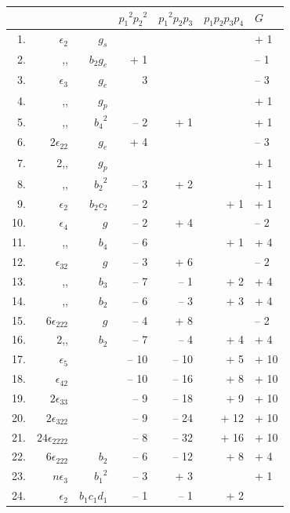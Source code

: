 \documentclass[11pt,a4paper,english]{article}
\theoremstyle{plain}
\begin{document}
\begin{center}
\begin{tabular}{r @{\quad} r @{\quad} r | r | r | r}
& & & ${p_1}^2{p_2}^2$ & ${p_1}^2p_2p_3$ & $p_1p_2p_3p_4$ & $G$ \\ .& $\epsilon_2$ & $g_s$ & & & & + 1 \\
2.& ,, & $b_2g_e$ & + 1 & & & -- 1 \\
3.& $\epsilon_3$ & $g_e$ & 3 & & & -- 3 \\
4.& ,, & $g_p$ & & & & + 1 \\
5.& ,, & ${b_4}^2$ & -- 2 & + 1 & & + 1 \\
6.& $2\epsilon_{22}$ & $g_e$ & + 4 & & & -- 3 \\
7.& 2,, & $g_p$ & & & & + 1 \\
8.& ,, & ${b_2}^2$ & -- 3 & + 2 & & + 1 \\
9.& $\epsilon_2$ & $b_2c_2$ & -- 2 & & + 1 & + 1 \\
10.& $\epsilon_4$ & $g$ & -- 2 & + 4 & & -- 2 \\
11.& ,, & $b_4$ & -- 6 & & + 1 & + 4 \\
12.& $\epsilon_{32}$ & $g$ & -- 3 & + 6 & & -- 2 \\
13.& ,, & $b_3$ & -- 7 & -- 1 & + 2 & + 4 \\
14.& ,, & $b_2$ & -- 6 & -- 3 & + 3 & + 4 \\
15.& $6\epsilon_{222}$ & $g$ & -- 4 & + 8 & & -- 2 \\
16.& 2,, & $b_2$ & -- 7 & -- 4 & + 4 & + 4 \\
17.& $\epsilon_5$ & & -- 10 & -- 10 & + 5 & + 10 \\
18.& $\epsilon_{42}$ & & -- 10 & -- 16 & + 8 & + 10 \\
19.& $2\epsilon_{33}$ & & -- 9 & -- 18 & + 9 & + 10 \\
20.& $2\epsilon_{322}$ & & -- 9 & -- 24 & + 12 & + 10 \\
21.& $24\epsilon_{2222}$ & & -- 8 & -- 32 & + 16 & + 10 \\
22.& $6\epsilon_{222}$ & $b_2$ & -- 6 & -- 12 & + 8 & + 4 \\
23.& $n\epsilon_3$ & ${b_1}^2$ & -- 3 & + 3 & & + 1 \\
24.& $\epsilon_2$ & $b_1c_1d_1$ & -- 1 & -- 1 & + 2 & \\
\end{tabular}
\end{center}
\end{document}
